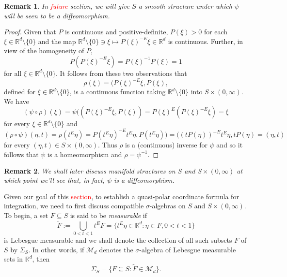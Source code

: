 \documentclass[11pt]{article}
\theoremstyle{theorem}
\newtheorem{remark}{Remark}
\begin{document}
\begin{remark}
In \textcolor{red}{future} section, we will give $S$ a smooth structure under which $\psi$ will be seen to be a diffeomorphism.
\end{remark}

\begin{proof}
Given that $P$ is continuous and positive-definite, $P(\xi)>0$ for each $\xi\in \mathbb{R}^d\setminus\{0\}$ and the map $\mathbb{R}^d\setminus\{0\}\ni \xi \mapsto P(\xi)^{-E}\xi\in \mathbb{R}^d$ is continuous. Further, in view of the homogeneity of $P$,
\begin{equation*}
P\left(P(\xi)^{-E}\xi\right)=P(\xi)^{-1}P(\xi)=1
\end{equation*}
for all $\xi\in\mathbb{R}^d\setminus\{0\}$. It follows from these two observations that
\begin{equation*}
\rho(\xi)=(P(\xi)^{-E}\xi,P(\xi),
\end{equation*}
defined for $\xi\in\mathbb{R}^d\setminus\{0\}$, is a continuous function taking $\mathbb{R}^d\setminus\{0\}$ into $S\times (0,\infty)$. We have
\begin{equation*}
(\psi\circ \rho)(\xi)=\psi((P(\xi)^{-E}\xi,P(\xi))=P(\xi)^{E}(P(\xi)^{-E}\xi)=\xi
\end{equation*}
for every $\xi\in \mathbb{R}^d\setminus \{0\}$ and
\begin{equation*}
(\rho\circ\psi)(\eta,t)=\rho(t^E\eta)=P(t^{E}\eta)^{-E}t^{E}\eta,P(t^{E}\eta))=((tP(\eta))^{-E}t^E\eta,tP(\eta)=(\eta,t)
\end{equation*}
for every $(\eta,t)\in S\times (0,\infty)$. Thus $\rho$ is a (continuous) inverse for $\psi$ and so it follows that $\psi$ is a homeomorphism and $\rho=\psi^{-1}$.
\end{proof}


\begin{remark}We shall later discuss manifold structures on $S$ and $S\times (0,\infty)$ at which point we'll see that, in fact, $\psi$ is a diffeomorphism.
\end{remark}

\noindent Given our goal of this \textcolor{red}{section}, to establish a quasi-polar coordinate formula for integration, we need to first discuss compatible $\sigma$-algebras on $S$ and $S\times (0,\infty)$. To begin, a set $F\subseteq S$ is said to be \textit{measurable} if
\begin{equation*}
\widetilde F:=\bigcup_{0<t<1}t^E F=\{t^E\eta\in\mathbb{R}^d:\eta\in F,0<t<1\}
\end{equation*}
is Lebesgue measurable and we shall denote the collection of all such subsets $F$ of $S$ by $\Sigma_S$. In other words, if $\mathcal{M}_d$ denotes the $\sigma$-algebra of Lebesgue measurable sets in $\mathbb{R}^d$, then
\begin{equation*}
\Sigma_S=\{F\subseteq S:\widetilde{F}\in\mathcal{M}_d\}.
\end{equation*}
\end{document}
